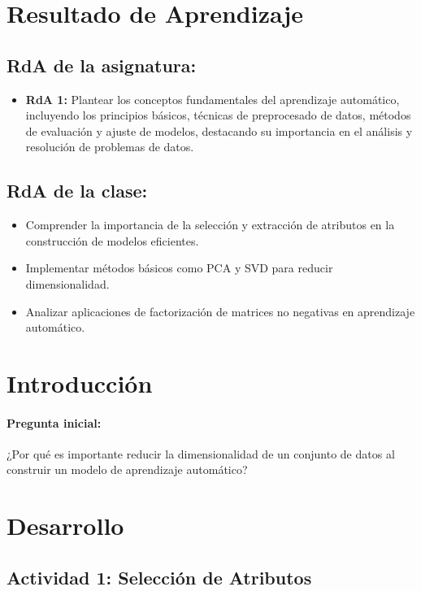 \documentclass[a4,11pt]{aleph-notas}
\begin{document}
\encabezado


\section*{Resultado de Aprendizaje}

\subsection*{RdA de la asignatura:}
\begin{itemize}[leftmargin=*]
    \item \textbf{RdA 1:} 
    Plantear los conceptos fundamentales del aprendizaje automático, incluyendo los principios básicos, técnicas de preprocesado de datos, métodos de evaluación y ajuste de modelos, destacando su importancia en el análisis y resolución de problemas de datos.
\end{itemize}

\subsection*{RdA de la clase:}
    \begin{itemize}[leftmargin=*]
        \item Comprender la importancia de la selección y extracción de atributos en la construcción de modelos eficientes.
        \item Implementar métodos básicos como PCA y SVD para reducir dimensionalidad.
        \item Analizar aplicaciones de factorización de matrices no negativas en aprendizaje automático.
    \end{itemize}

\section*{Introducción}

\paragraph{Pregunta inicial:} 
¿Por qué es importante reducir la dimensionalidad de un conjunto de datos al construir un modelo de aprendizaje automático?


\section*{Desarrollo}

\subsection*{Actividad 1: Selección de Atributos}
\end{document}
